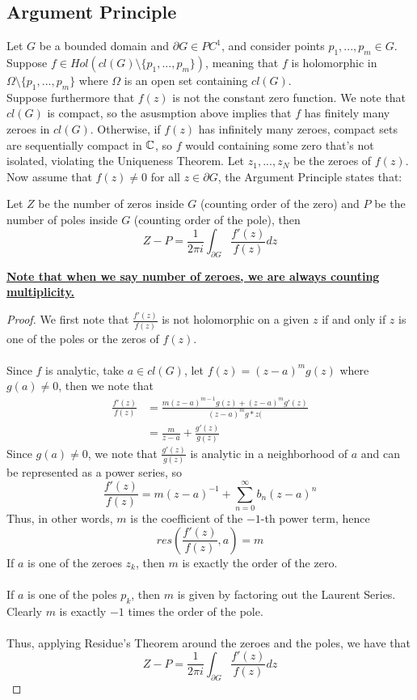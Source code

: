 \subsection{Argument Principle}

Let $G$ be a bounded domain and $\partial G \in PC^1$, and consider points $p_1, ..., p_m \in G$. Suppose $f \in Hol(cl(G) \setminus \{p_1, ..., p_m\})$, meaning that $f$ is holomorphic in $\Omega \setminus \{p_1, ..., p_m\}$ where $\Omega$ is an open set containing $cl(G)$.\\

Suppose furthermore that $f(z)$ is not the constant zero function. We note that $cl(G)$ is compact, so the asusmption above implies that $f$ has finitely many zeroes in $cl(G)$. Otherwise, if $f(z)$ has infinitely many zeroes, compact sets are sequentially compact in $\mathbb{C}$, so $f$ would containing some zero that's not isolated, violating the Uniqueness Theorem. Let $z_1, ..., z_N$ be the zeroes of $f(z)$.\\

Now assume that $f(z) \neq 0$ for all $z \in \partial G$, the Argument Principle states that:

\begin{theorem}
Let $Z$ be the number of zeros inside $G$ (counting order of the zero) and $P$ be the number of poles inside $G$ (counting order of the pole), then
\[Z - P = \frac{1}{2\pi i} \int_{\partial G} \frac{f'(z)}{f(z)} dz\]
\end{theorem}

\underline{\textbf{Note that when we say number of zeroes, we are always counting multiplicity.}}

\begin{proof}
We first note that $\frac{f'(z)}{f(z)}$ is not holomorphic on a given $z$ if and only if $z$ is one of the poles or the zeros of $f(z)$.\\\\
Since $f$ is analytic, take $a \in cl(G)$, let $f(z) = (z - a)^m g(z)$ where $g(a) \neq 0$, then we note that
\begin{align*}
    \frac{f'(z)}{f(z)} &= \frac{m(z - a)^{m-1} g(z) + (z-a)^m g'(z)}{(z - a)^m g*z(}\\
    &= \frac{m}{z - a} + \frac{g'(z)}{g(z)}
\end{align*}
Since $g(a) \neq 0$, we note that $\frac{g'(z)}{g(z)}$ is analytic in a neighborhood of $a$ and can be represented as a power series, so
\[\frac{f'(z)}{f(z)} = m(z - a)^{-1} + \sum_{n = 0}^\infty b_n (z - a)^n\]
Thus, in other words, $m$ is the coefficient of the $-1$-th power term, hence
\[res(\frac{f'(z)}{f(z)}, a) = m\]
If $a$ is one of the zeroes $z_k$, then $m$ is exactly the order of the zero.\\\\
If $a$ is one of the poles $p_k$, then $m$ is given by factoring out the Laurent Series. Clearly $m$ is exactly $-1$ times the order of the pole.\\\\
Thus, applying Residue's Theorem around the zeroes and the poles, we have that
\[Z - P = \frac{1}{2\pi i} \int_{\partial G} \frac{f'(z)}{f(z)} dz\]
\end{proof}

